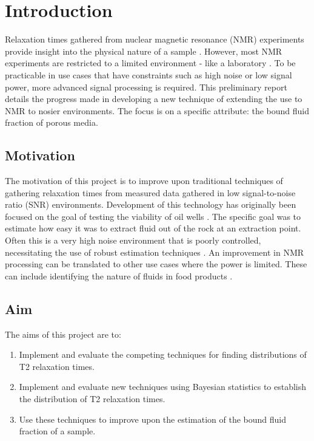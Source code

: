 \chapter{Introduction}\label{C:intro}
Relaxation times gathered from nuclear magnetic resonance (NMR) experiments provide insight into the physical nature of a sample \cite{GruberLinearFunctionals2013}. However, most NMR experiments are restricted to a limited environment - like a laboratory \cite{IntrinsicSNREdelstein1986}. To be practicable in use cases that have constraints such as high noise or low signal power, more advanced signal processing is required. This preliminary report details the progress made in developing a new technique of extending the use to NMR to nosier environments. The focus is on a specific attribute: the bound fluid fraction of porous media.
\section{Motivation}
The motivation of this project is to improve upon traditional techniques of gathering relaxation times from measured data gathered in low signal-to-noise ratio (SNR) environments. Development of this technology has originally been focused on the goal of testing the viability of oil wells \cite{wellLoggingBook}. The specific goal was to estimate how easy it was to extract fluid out of the rock at an extraction point. Often this is a very high noise environment that is poorly controlled, necessitating the use of robust estimation techniques \cite{BadTruthLaplaceEpstein2008} \cite{NumericalInversionLaplaceTransform1978}. An improvement in NMR processing can be translated to other use cases where the power is limited. These can include identifying the nature of fluids in food products \cite{NMRFOODCapitani2017}.
\section{Aim}
The aims of this project are to:
\begin{enumerate}
    \item Implement and evaluate the competing techniques for finding distributions of T2 relaxation times.
    \item Implement and evaluate new techniques using Bayesian statistics to establish the distribution of T2 relaxation times.
    \item Use these techniques to improve upon the estimation of the bound fluid fraction of a sample.
\end{enumerate}


